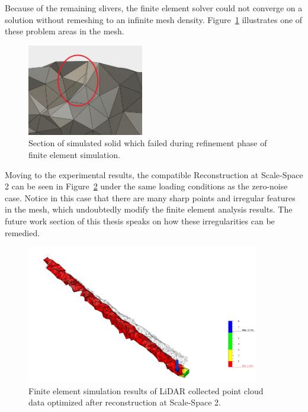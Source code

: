 \documentclass[12pt]{drexelthesis}
\begin{document}
Because of the remaining slivers, the finite element solver could not converge on a solution without remeshing to an infinite mesh density. Figure~\ref{conc:gnoiseproblem} illustrates one of these problem areas in the mesh.

\begin{figure}[!ht]
	\centering
		\includegraphics[width=2in]{conclusion/noiseSS2BoundedProblem.jpg}
		\caption[Failure section of noise induced solid volume]{\centering Section of simulated solid which failed during refinement phase of finite element simulation.}
	\label{conc:gnoiseproblem}
\end{figure}

Moving to the experimental results, the compatible Reconstruction at Scale-Space 2 can be seen in Figure~\ref{conc:realSS2FEresult} under the same loading conditions as the zero-noise case. Notice in this case that there are many sharp points and irregular features in the mesh, which undoubtedly modify the finite element analysis results. The future work section of this thesis speaks on how these irregularities can be remedied.

\begin{figure}[!ht]
	\centering
		\includegraphics[width=4in]{conclusion/realscalnv1.png}
		\caption[Finite element simulation of LiDAR collected point cloud data]{\centering Finite element simulation results of LiDAR collected point cloud data optimized after reconstruction at Scale-Space 2.}
		\label{conc:realSS2FEresult}
\end{figure}
\end{document}
